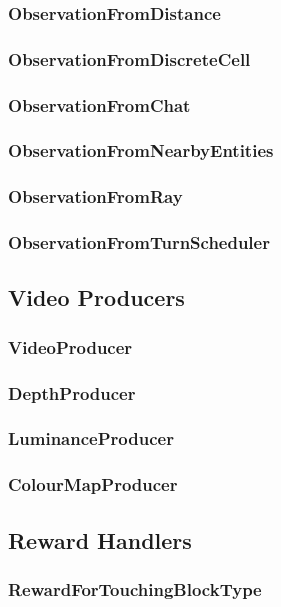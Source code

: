 \documentclass[11pt]{article} %
\begin{document}
\subsubsection{ObservationFromDistance}
\subsubsection{ObservationFromDiscreteCell}
\subsubsection{ObservationFromChat}
\subsubsection{ObservationFromNearbyEntities}
\subsubsection{ObservationFromRay}
\subsubsection{ObservationFromTurnScheduler}

\subsection{Video Producers}

\subsubsection{VideoProducer}
\subsubsection{DepthProducer}
\subsubsection{LuminanceProducer}
\subsubsection{ColourMapProducer}

\subsection{Reward Handlers}

\subsubsection{RewardForTouchingBlockType}
\end{document}
